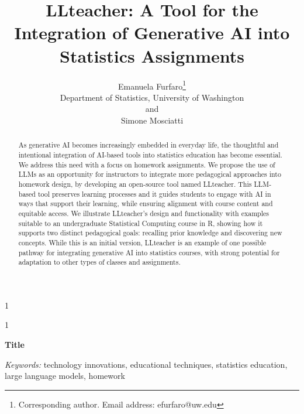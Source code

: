 \documentclass[
  12pt]{article}
\newcommand{\anon}{1}
\begin{document}
\def\spacingset#1{\renewcommand{\baselinestretch}%
{#1}\small\normalsize} \spacingset{1}




\anon
{
  \title{\bf LLteacher: A Tool for the Integration of Generative AI into Statistics Assignments}
 \author{Emanuela Furfaro\footnote{Corresponding author. Email address: efurfaro@uw.edu} \hspace{.2cm}\\
    Department of Statistics, University of Washington \\
        and \\
  Simone Mosciatti \\
    }
\date{}
  \maketitle
} \fi

\anon
{
  \bigskip
  \bigskip
  \bigskip
  \begin{center}
    {\LARGE\bf Title}
\end{center}
  \medskip
} \fi

\bigskip
\begin{abstract}
As generative AI becomes increasingly embedded in everyday life, the thoughtful and intentional integration of AI-based tools into statistics education has become essential. 
We address this need with a focus on homework assignments. We propose the use of LLMs as an opportunity for instructors to integrate more pedagogical approaches into homework design, by developing an open-source tool named LLteacher. 
This LLM-based tool preserves learning processes and it guides students to engage with AI in ways that support their learning, while ensuring alignment with course content and equitable access.
We illustrate LLteacher's design and functionality with examples suitable to an undergraduate Statistical Computing course in R, showing how it supports two distinct pedagogical goals: recalling prior knowledge and discovering new concepts.
While this is an initial version, LLteacher is an example of one possible pathway for integrating generative AI into statistics courses, with strong potential for adaptation to other types of classes and assignments.
\end{abstract}

\noindent%
{\it Keywords:} technology innovations, educational techniques, statistics education, large language models, homework\\
\end{document}
